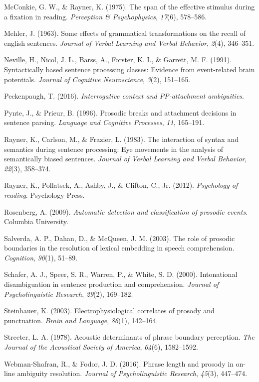 \documentclass[11pt,oneside]{book}
\begin{document}
\leavevmode\hypertarget{ref-spanmcr}{}%
McConkie, G. W., \& Rayner, K. (1975). The span of the effective stimulus during a fixation in reading. \emph{Perception \& Psychophysics}, \emph{17}(6), 578--586.

\leavevmode\hypertarget{ref-mehler1963some}{}%
Mehler, J. (1963). Some effects of grammatical transformations on the recall of english sentences. \emph{Journal of Verbal Learning and Verbal Behavior}, \emph{2}(4), 346--351.

\leavevmode\hypertarget{ref-p600}{}%
Neville, H., Nicol, J. L., Barss, A., Forster, K. I., \& Garrett, M. F. (1991). Syntactically based sentence processing classes: Evidence from event-related brain potentials. \emph{Journal of Cognitive Neuroscience}, \emph{3}(2), 151--165.

\leavevmode\hypertarget{ref-qp2}{}%
Peckenpaugh, T. (2016). \emph{Interrogative context and PP-attachment ambiguities}.

\leavevmode\hypertarget{ref-pynte1996prosodic}{}%
Pynte, J., \& Prieur, B. (1996). Prosodic breaks and attachment decisions in sentence parsing. \emph{Language and Cognitive Processes}, \emph{11}, 165--191.

\leavevmode\hypertarget{ref-raynerEtAl1983}{}%
Rayner, K., Carlson, M., \& Frazier, L. (1983). The interaction of syntax and semantics during sentence processing: Eye movements in the analysis of semantically biased sentences. \emph{Journal of Verbal Learning and Verbal Behavior}, \emph{22}(3), 358--374.

\leavevmode\hypertarget{ref-rayner2012psychology}{}%
Rayner, K., Pollatsek, A., Ashby, J., \& Clifton, C., Jr. (2012). \emph{Psychology of reading}. Psychology Press.

\leavevmode\hypertarget{ref-andrew}{}%
Rosenberg, A. (2009). \emph{Automatic detection and classification of prosodic events}. Columbia University.

\leavevmode\hypertarget{ref-salverda2003role}{}%
Salverda, A. P., Dahan, D., \& McQueen, J. M. (2003). The role of prosodic boundaries in the resolution of lexical embedding in speech comprehension. \emph{Cognition}, \emph{90}(1), 51--89.

\leavevmode\hypertarget{ref-schafer2000intonational}{}%
Schafer, A. J., Speer, S. R., Warren, P., \& White, S. D. (2000). Intonational disambiguation in sentence production and comprehension. \emph{Journal of Psycholinguistic Research}, \emph{29}(2), 169--182.

\leavevmode\hypertarget{ref-p600addscps}{}%
Steinhauer, K. (2003). Electrophysiological correlates of prosody and punctuation. \emph{Brain and Language}, \emph{86}(1), 142--164.

\leavevmode\hypertarget{ref-streeter1978acoustic}{}%
Streeter, L. A. (1978). Acoustic determinants of phrase boundary perception. \emph{The Journal of the Acoustical Society of America}, \emph{64}(6), 1582--1592.

\leavevmode\hypertarget{ref-webman2016phrase}{}%
Webman-Shafran, R., \& Fodor, J. D. (2016). Phrase length and prosody in on-line ambiguity resolution. \emph{Journal of Psycholinguistic Research}, \emph{45}(3), 447--474.
\end{document}
